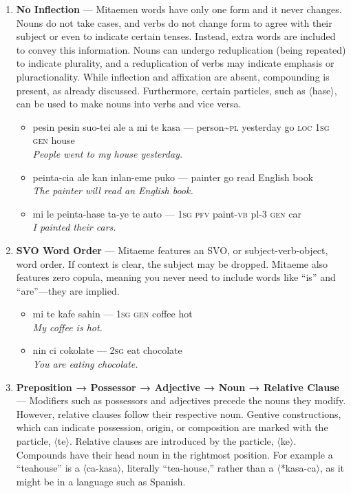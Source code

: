 \documentclass[a4paper]{article}
\begin{document}
\begin{enumerate}
	\item \textbf{No Inflection} — Mitaemen words have only one form and it never changes. Nouns do not take cases, and verbs do not change form to agree with their subject or even to indicate certain tenses. Instead, extra words are included to convey this information. Nouns can undergo reduplication (being repeated) to indicate plurality, and a reduplication of verbs may indicate emphasis or pluractionality. While inflection and affixation are absent, compounding is present, as already discussed.  Furthermore, certain particles, such as $\langle$hase$\rangle$, can be used to make nouns into verbs and vice versa.
	\begin{itemize}
		\item pesin pesin suo-tei ale a mi te kasa — person\textasciitilde{}\textsc{pl} yesterday go \textsc{loc 1sg gen} house\\\textit{People went to my house yesterday.}
		\item peinta-cia ale kan inlan-eme puko — painter go read English book\\\textit{The painter will read an English book.}
		\item mi le peinta-hase ta-ye te auto — \textsc{1sg pfv} paint-\textsc{vb} pl-3 \textsc{gen} car \\\textit{I painted their cars.}
	\end{itemize}
	\item \textbf{SVO Word Order} — Mitaeme features an SVO, or subject-verb-object, word order. If context is clear, the subject may be dropped. Mitaeme also features zero copula, meaning you never need to include words like ``is'' and ``are''—they are implied.
	\begin{itemize}
		\item mi te kafe sahin — \textsc{1sg} \textsc{gen} coffee hot\\\textit{My coffee is hot.}
		\item nin ci cokolate — \textsc{2sg} eat chocolate\\\textit{You are eating chocolate.}
	\end{itemize}
	\item \textbf{ Preposition → Possessor → Adjective → Noun → Relative Clause  } — Modifiers such as possessors and adjectives precede the nouns they modify. However, relative clauses follow their respective noun. Gentive constructions, which can indicate possession, origin, or composition are marked with the particle, $\langle$te$\rangle$. Relative clauses are introduced by the particle, $\langle$ke$\rangle$. Compounds have their head noun in the rightmost position. For example a ``teahouse'' is a $\langle$ca-kasa$\rangle$, literally ``tea-house,'' rather than a $\langle$*kasa-ca$\rangle$, as it might be in a language such as Spanish.

\end{enumerate}
\end{document}
